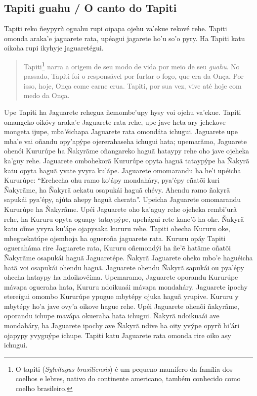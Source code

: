 \begin{itemize}
\chapter{Tapiti guahu / O canto do Tapiti}

Tapiti reko ñeypyrũ oguahu rupi oipapa ojehu va'ekue rekové rehe. Tapiti
omonda araka'e jaguarete rata, upéagui jagarete ho'u so'o pyry. Ha
Tapiti katu oikoha rupi ikyhyje jaguaretégui.

\begin{quote}
Tapiti\footnote{O tapiti (\emph{Sylvilagus brasiliensis}) é um pequeno
  mamífero da família dos coelhos e lebres, nativo do continente
  americano, também conhecido como coelho brasileiro.} narra a origem de
seu modo de vida por meio de seu \emph{guahu}. No passado, Tapiti foi o
responsável por furtar o fogo, que era da Onça. Por isso, hoje, Onça
come carne crua. Tapiti, por sua vez, vive até hoje com medo da Onça.
\end{quote}

Upe Tapiti ha Jaguarete rehegua ñemombe'upy hysy voi ojehu va'ekue.
Tapiti omangeko oikóvy araka'e Jaguarete rata rehe, upe jave heta ary
jehekove mongeta ijupe, mba'éichapa Jaguarete rata omondáta ichugui.
Jaguarete upe mba'e vai oñandu opy'apýpe ojererahaseha ichugui hata;
upemarãmo, Jaguarete ohenói Kururúpe ha Ñakyrãme oñangareko haguã
hataypy rehe oho jave ojeheka ka'guy rehe. Jaguarete ombohekorã Kururúpe
opyta haguã tataypýpe ha Ñakyrã katu opyta haguã yvate yvyra ku'ápe.
Jaguarete omomarandu ha he'i upéicha Kururúpe: ``Erehecha ohu ramo
ko'ápy mondaháry, pya'épy eñatõi kuri Ñakyrãme, ha Ñakyrã aekatu
osapukái haguã chévy. Ahendu ramo ñakyrã sapukái pya'épy, ajúta ahepy
haguã cherata''. Upeicha Jaguarete omomarandu Kururúpe ha Ñakyrãme. Upéi
Jaguarete oho ka'aguy rehe ojeheka rembi'urã rehe, ha Kururu opyta
oguapy tataypýpe, upehágui rete kane'õ ha oke. Ñakyrã katu oĩme yvyra
ku'ápe ojapysaka kururu rehe. Tapiti ohecha Kururu oke, mbeguekatúpe
ojemboja ha ogueroña jaguarete rata. Kururu opáy Tapiti ogueraháma rire
Jaguarete rata, Kururu oñemondýi ha ñe'ẽ hatãme oñatõi Ñakyrãme osapukái
haguã Jaguaretépe. Ñakyrã Jaguarete oheko mbo'e haguéicha hatã voi
osapukái ohendu haguã. Jaguarete ohendu Ñakyrã sapukái ou pya'épy ohecha
hataypy ha ndoikovéima. Upemaramo, Jaguarete oporandu Kururúpe mávapa
ogueraha hata, Kururu ndoikuaái mávapa mondaháry. Jaguarete ipochy
etereígui omombo Kururúpe ypugue mbytépy ojuka haguã yrupive. Kururu y
mbytépy ho'a jave ovy'a oikove hague rehe. Upéi Jaguarete ohenõi
ñakyrãme, oporandu ichupe mavápa okueraha hata ichugui. Ñakyrã ndoikuaái
ave mondaháry, ha Jaguarete ipochy ave Ñakyrã ndive ha oity yvýpe opyrũ
hi'ári ojapypy yvyguýpe ichupe. Tapiti katu Jaguarete rata omonda rire
oiko asy ichugui.


\end{itemize}
